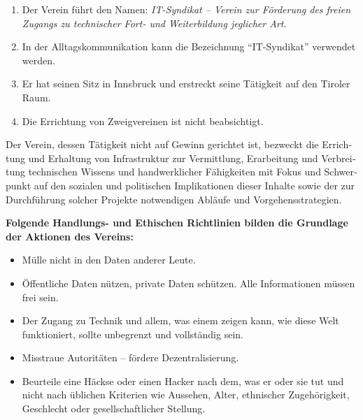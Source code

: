 \begin{otherlanguage}{german}

\selectfont\tiny


\begin{enumerate}[statutenenum]
    \item Der Verein führt den Namen: \textit{IT-Syndikat -- Verein zur Förderung des freien Zugangs zu technischer Fort- und Weiterbildung jeglicher Art}.
    \item In der Alltagskommunikation kann die Bezeichnung
      ``IT-Syndikat'' verwendet werden.

    \item Er hat seinen Sitz in Innsbruck und erstreckt seine Tätigkeit auf den Tiroler Raum.

    \item Die Errichtung von Zweigvereinen ist nicht beabsichtigt.
\end{enumerate}


Der Verein, dessen Tätigkeit nicht auf Gewinn gerichtet ist, bezweckt die Errichtung und Erhaltung von Infrastruktur zur Vermittlung, Erarbeitung und Verbreitung technischen Wissens und handwerklicher Fähigkeiten mit Fokus und Schwerpunkt auf den sozialen und politischen Implikationen dieser Inhalte sowie der zur Durchführung solcher Projekte notwendigen Abläufe und Vorgehensstrategien.

\textbf{Folgende Handlungs- und Ethischen Richtlinien bilden die Grundlage der Aktionen des Vereins:}

\begin{itemize}[statutenenum]
    \item Mülle nicht in den Daten anderer Leute.

    \item Öffentliche Daten nützen, private Daten schützen.
        Alle Informationen müssen frei sein.

    \item Der Zugang zu Technik und allem, was einem zeigen kann, wie diese Welt funktioniert, sollte unbegrenzt und vollständig sein.

    \item Misstraue Autoritäten -- fördere Dezentralisierung.

    \item Beurteile eine Häckse oder einen Hacker nach dem, was er oder sie tut und nicht nach üblichen Kriterien wie Aussehen, Alter, ethnischer Zugehörigkeit, Geschlecht oder gesellschaftlicher Stellung.


\end{itemize}
\end{otherlanguage}
